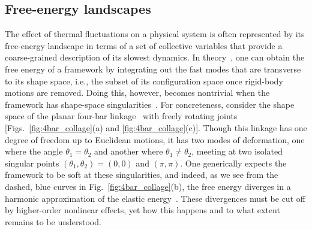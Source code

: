 \subsection{Free-energy landscapes}

The effect of thermal fluctuations on a physical system is often represented by its free-energy landscape in terms of a set of collective variables that provide a coarse-grained description of its slowest dynamics.
In theory~\cite{go1976,echenique2011}, one can obtain the free energy of a framework by integrating out the fast modes that are transverse to its shape space, i.e., the subset of its configuration space once rigid-body motions are removed.
Doing this, however, becomes nontrivial when the framework has shape-space singularities~\cite{zlatanov2002,liu2003,donelan2007}.
For concreteness, consider the shape space of the planar four-bar linkage~\cite{grashof1883,hartenberg1964,shimamoto2005} with freely rotating joints [Figs.~\ref{fig:4bar_collage}(a) and \ref{fig:4bar_collage}(c)].
Though this linkage has one degree of freedom up to Euclidean motions, it has two modes of deformation, one where the angle $\theta_1 = \theta_2$ and another where $\theta_1 \ne \theta_2$, meeting at two isolated singular points $(\theta_1,\theta_2) = (0,0)$ and $(\pi,\pi)$.
One generically expects the framework to be soft at these singularities, and indeed, as we see from the dashed, blue curves in Fig.~\ref{fig:4bar_collage}(b), the free energy diverges in a harmonic approximation of the elastic energy~\cite{rocklin2018}.
These divergences must be cut off by higher-order nonlinear effects, yet how this happens and to what extent remains to be understood.


